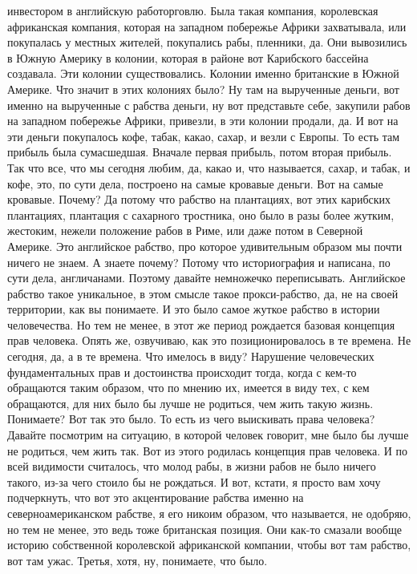 инвестором в английскую работорговлю. Была такая компания, королевская
африканская компания, которая на западном побережье Африки захватывала, или
покупалась у местных жителей, покупались рабы, пленники, да. Они вывозились в
Южную Америку в колонии, которая в районе вот Карибского бассейна создавала. Эти
колонии существовались. Колонии именно британские в Южной Америке. Что значит в
этих колониях было? Ну там на вырученные деньги, вот именно на вырученные с
рабства деньги, ну вот представьте себе, закупили рабов на западном побережье
Африки, привезли, в эти колонии продали, да. И вот на эти деньги покупалось
кофе, табак, какао, сахар, и везли с Европы. То есть там прибыль была
сумасшедшая. Вначале первая прибыль, потом вторая прибыль. Так что все, что мы
сегодня любим, да, какао и, что называется, сахар, и табак, и кофе, это, по сути
дела, построено на самые кровавые деньги. Вот на самые кровавые. Почему? Да
потому что рабство на плантациях, вот этих карибских плантациях, плантация с
сахарного тростника, оно было в разы более жутким, жестоким, нежели положение
рабов в Риме, или даже потом в Северной Америке. Это английское рабство, про
которое удивительным образом мы почти ничего не знаем. А знаете почему? Потому
что историография и написана, по сути дела, англичанами. Поэтому давайте
немножечко переписывать. Английское рабство такое уникальное, в этом смысле
такое прокси-рабство, да, не на своей территории, как вы понимаете. И это было
самое жуткое рабство в истории человечества. Но тем не менее, в этот же период
рождается базовая концепция прав человека. Опять же, озвучиваю, как это
позиционировалось в те времена. Не сегодня, да, а в те времена. Что имелось в
виду? Нарушение человеческих фундаментальных прав и достоинства происходит
тогда, когда с кем-то обращаются таким образом, что по мнению их, имеется в виду
тех, с кем обращаются, для них было бы лучше не родиться, чем жить такую жизнь.
Понимаете? Вот так это было. То есть из чего выискивать права человека? Давайте
посмотрим на ситуацию, в которой человек говорит, мне было бы лучше не родиться,
чем жить так. Вот из этого родилась концепция прав человека. И по всей видимости
считалось, что молод рабы, в жизни рабов не было ничего такого, из-за чего
стоило бы не рождаться. И вот, кстати, я просто вам хочу подчеркнуть, что вот
это акцентирование рабства именно на северноамериканском рабстве, я его никоим
образом, что называется, не одобряю, но тем не менее, это ведь тоже британская
позиция. Они как-то смазали вообще историю собственной королевской африканской
компании, чтобы вот там рабство, вот там ужас. Третья, хотя, ну, понимаете, что
было. 

